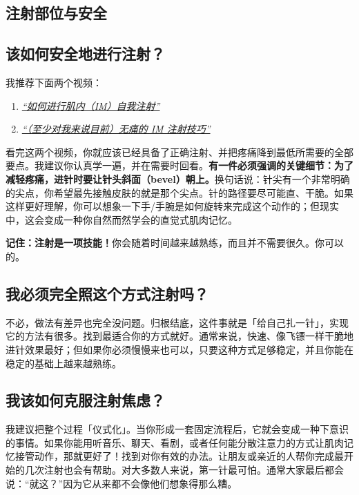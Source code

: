\documentclass{article}
\begin{document}
\subsection*{注射部位与安全}

\subsection{该如何安全地进行注射？}

我推荐下面两个视频：

\begin{enumerate}
  \item \href{https://www.youtube.com/watch?v=cBabaGC2Dok}{\textit{“如何进行肌内（IM）自我注射”}}
  \item \href{https://www.youtube.com/watch?v=YfNlAZLxLyw}{\textit{“（至少对我来说目前）无痛的 IM 注射技巧”}}
\end{enumerate}

看完这两个视频，你就应该已经具备了正确注射、并把疼痛降到最低所需要的全部要点。我建议你认真学一遍，并在需要时回看。\textbf{有一件必须强调的关键细节：为了减轻疼痛，进针时要让针头斜面（bevel）朝上。}换句话说：针尖有一个非常明确的尖点，你希望最先接触皮肤的就是那个尖点。针的路径要尽可能直、干脆。如果这样更好理解，你可以想象一下手/手腕是如何旋转来完成这个动作的；但现实中，这会变成一种你自然而然学会的直觉式肌肉记忆。

\textbf{记住：注射是一项技能！}你会随着时间越来越熟练，而且并不需要很久。你可以的。

\subsection{我必须完全照这个方式注射吗？}

不必，做法有差异也完全没问题。归根结底，这件事就是「给自己扎一针」，实现它的方法有很多。找到最适合你的方式就好。通常来说，快速、像飞镖一样干脆地进针效果最好；但如果你必须慢慢来也可以，只要这种方式足够稳定，并且你能在稳定的基础上越来越熟练。

\subsection{我该如何克服注射焦虑？}

我建议把整个过程「仪式化」。当你形成一套固定流程后，它就会变成一种下意识的事情。如果你能用听音乐、聊天、看剧，或者任何能分散注意力的方式让肌肉记忆接管动作，那就更好了！找到对你有效的办法。让朋友或亲近的人帮你完成最开始的几次注射也会有帮助。对大多数人来说，第一针最可怕。通常大家最后都会说：“就这？”因为它从来都不会像他们想象得那么糟。
\end{document}
